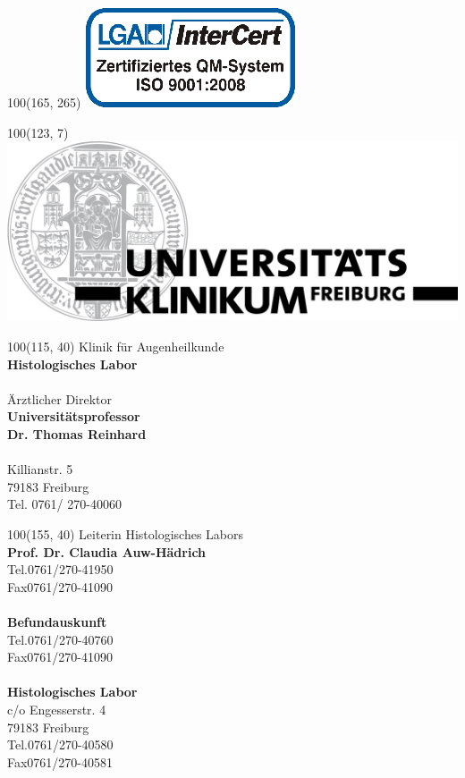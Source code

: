 \documentclass[12pt]{g-brief}
\begin{document}
 

\baselineskip10pt

\textblockorigin{0in}{0in}
\setlength{\TPHorizModule}{1mm}
\setlength{\TPVertModule}{1mm}

{
\scriptsize
\begin{textblock}{100}(165, 265) 
\includegraphics[scale=0.4]{LogoFrei.png}
\end{textblock}
}
{
\scriptsize
\begin{textblock}{100}(123, 7) 
\includegraphics[scale=0.25]{Formuladr.png}
\end{textblock}
}

{
\scriptsize
\begin{textblock}{100}(115, 40) 
Klinik für Augenheilkunde \\
\textbf{Histologisches Labor}\\\\
Ärztlicher Direktor\\
\textbf{Universitätsprofessor\\
Dr. Thomas Reinhard}\\\\
Killianstr. 5\\
79183 Freiburg\\
Tel. 0761/ 270-40060\\
\end{textblock}
}

{
\scriptsize
\begin{textblock}{100}(155, 40) 
Leiterin Histologisches Labors\\
\textbf{Prof. Dr. Claudia Auw-Hädrich}\\
Tel.0761/270-41950\\
Fax0761/270-41090\\\\
\textbf{Befundauskunft}\\
Tel.0761/270-40760\\
Fax0761/270-41090\\\\
\textbf{Histologisches Labor}\\
c/o Engesserstr. 4\\
79183 Freiburg\\
Tel.0761/270-40580\\
Fax0761/270-40581
\end{textblock}
}
\end{document}
